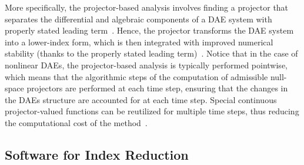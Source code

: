 More specifically, the projector-based analysis involves finding a projector that separates the differential and algebraic components of a \ac{DAE} system with properly stated leading term~\cite{lamour2011computational}. Hence, the projector transforms the \ac{DAE} system into a lower-index form, which is then integrated with improved numerical stability (thanks to the properly stated leading term)~\cite{higueras2004differential}. Notice that in the case of nonlinear \acp{DAE}, the projector-based analysis is typically performed pointwise, which means that the algorithmic steps of the computation of admissible null-space projectors are performed at each time step, ensuring that the changes in the \acp{DAE} structure are accounted for at each time step. Special continuous projector-valued functions can be reutilized for multiple time steps, thus reducing the computational cost of the method~\cite{lamour2012detecting}.

\subsection{Software for Index Reduction}

